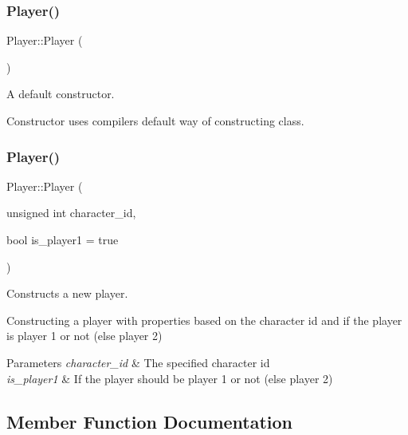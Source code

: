 \subsubsection{\texorpdfstring{Player()}{Player()}\hspace{0.1cm}{\footnotesize\ttfamily [1/2]}}
{\footnotesize\ttfamily Player\+::\+Player (\begin{DoxyParamCaption}{ }\end{DoxyParamCaption})\hspace{0.3cm}{\ttfamily [default]}}



A default constructor. 

Constructor uses compiler\textquotesingle{}s default way of constructing class. \mbox{\label{classPlayer_aaaf437645956b7fd7e0acc28b64d0ae4}} 
\subsubsection{\texorpdfstring{Player()}{Player()}\hspace{0.1cm}{\footnotesize\ttfamily [2/2]}}
{\footnotesize\ttfamily Player\+::\+Player (\begin{DoxyParamCaption}\item[{unsigned int}]{character\+\_\+id,  }\item[{bool}]{is\+\_\+player1 = {\ttfamily true} }\end{DoxyParamCaption})}



Constructs a new player. 

Constructing a player with properties based on the character id and if the player is player 1 or not (else player 2) 
\begin{DoxyParams}{Parameters}
{\em character\+\_\+id} & The specified character id \\
\hline
{\em is\+\_\+player1} & If the player should be player 1 or not (else player 2) \\
\hline
\end{DoxyParams}


\subsection{Member Function Documentation}
\mbox{\label{classPlayer_aa83d815158b15b6847b36c8d3473b371}} 
